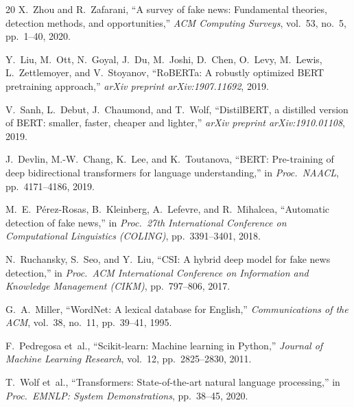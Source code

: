 \documentclass[journal,10pt,twocolumn]{IEEEtran}
\begin{document}
\begin{thebibliography}{20}
X.~Zhou and R.~Zafarani,
``A survey of fake news: Fundamental theories, detection methods, and
opportunities,''
\emph{ACM Computing Surveys}, vol.~53, no.~5, pp.~1--40, 2020.

Y.~Liu, M.~Ott, N.~Goyal, J.~Du, M.~Joshi, D.~Chen, O.~Levy,
M.~Lewis, L.~Zettlemoyer, and V.~Stoyanov,
``{RoBERTa}: A robustly optimized {BERT} pretraining approach,''
\emph{arXiv preprint arXiv:1907.11692}, 2019.

V.~Sanh, L.~Debut, J.~Chaumond, and T.~Wolf,
``{DistilBERT}, a distilled version of {BERT}: smaller, faster, cheaper
and lighter,''
\emph{arXiv preprint arXiv:1910.01108}, 2019.

J.~Devlin, M.-W.~Chang, K.~Lee, and K.~Toutanova,
``{BERT}: Pre-training of deep bidirectional transformers for language
understanding,''
in \emph{Proc.\ NAACL}, pp.~4171--4186, 2019.

M.~E.~P{\'e}rez-Rosas, B.~Kleinberg, A.~Lefevre, and R.~Mihalcea,
``Automatic detection of fake news,''
in \emph{Proc.\ 27th International Conference on Computational
Linguistics (COLING)}, pp.~3391--3401, 2018.

N.~Ruchansky, S.~Seo, and Y.~Liu,
``{CSI}: A hybrid deep model for fake news detection,''
in \emph{Proc.\ ACM International Conference on Information and
Knowledge Management (CIKM)}, pp.~797--806, 2017.

G.~A.~Miller,
``{WordNet}: A lexical database for {English},''
\emph{Communications of the ACM}, vol.~38, no.~11, pp.~39--41, 1995.

F.~Pedregosa et~al.,
``Scikit-learn: Machine learning in {Python},''
\emph{Journal of Machine Learning Research}, vol.~12, pp.~2825--2830, 2011.

T.~Wolf et~al.,
``Transformers: State-of-the-art natural language processing,''
in \emph{Proc.\ EMNLP: System Demonstrations}, pp.~38--45, 2020.

\end{thebibliography}
\end{document}
